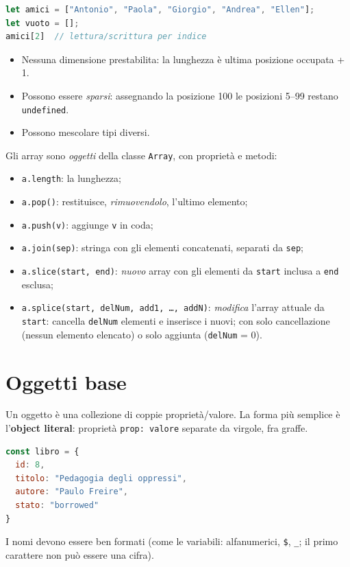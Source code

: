 \begin{lstlisting}[language=JavaScript]
let amici = ["Antonio", "Paola", "Giorgio", "Andrea", "Ellen"];
let vuoto = [];
amici[2]  // lettura/scrittura per indice
\end{lstlisting}
\begin{itemize}
  \item Nessuna dimensione prestabilita: la lunghezza \`e ultima posizione occupata + 1.
  \item Possono essere \emph{sparsi}: assegnando la posizione 100 le posizioni 5--99 restano
        \texttt{undefined}.
  \item Possono mescolare tipi diversi.
\end{itemize}
Gli array sono \emph{oggetti} della classe \texttt{Array}, con propriet\`a e metodi:
\begin{itemize}
  \item \texttt{a.length}: la lunghezza;
  \item \texttt{a.pop()}: restituisce, \emph{rimuovendolo}, l'ultimo elemento;
  \item \texttt{a.push(v)}: aggiunge \texttt{v} in coda;
  \item \texttt{a.join(sep)}: stringa con gli elementi concatenati, separati da \texttt{sep};
  \item \texttt{a.slice(start, end)}: \emph{nuovo} array con gli elementi da \texttt{start}
        inclusa a \texttt{end} esclusa;
  \item \texttt{a.splice(start, delNum, add1, \dots, addN)}: \emph{modifica} l'array attuale
        da \texttt{start}: cancella \texttt{delNum} elementi e inserisce i nuovi; con solo
        cancellazione (nessun elemento elencato) o solo aggiunta (\texttt{delNum} = 0).
\end{itemize}

\section{Oggetti base}

\begin{definizione}
Un oggetto \`e una collezione di coppie propriet\`a/valore. La forma pi\`u semplice \`e
l'\textbf{object literal}: propriet\`a \texttt{prop: valore} separate da virgole, fra graffe.
\begin{lstlisting}[language=JavaScript]
const libro = {
  id: 8,
  titolo: "Pedagogia degli oppressi",
  autore: "Paulo Freire",
  stato: "borrowed"
}
\end{lstlisting}
I nomi devono essere ben formati (come le variabili: alfanumerici, \texttt{\$},
\texttt{\_}; il primo carattere non pu\`o essere una cifra).
\end{definizione}


